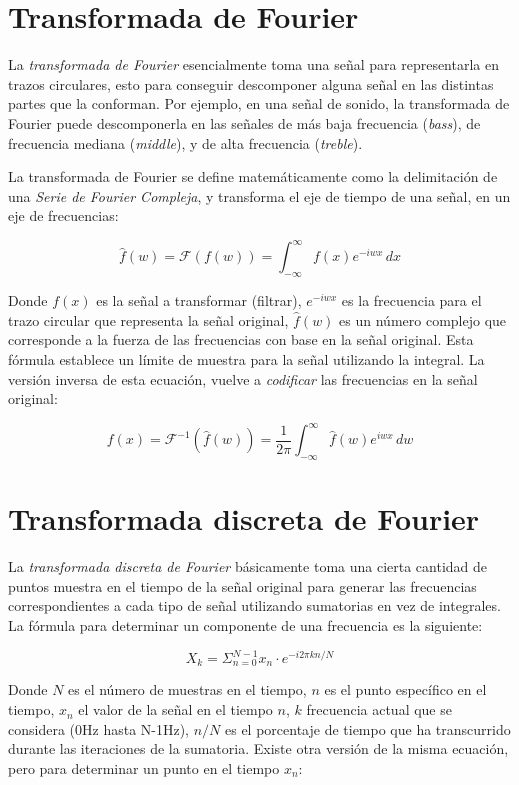 \documentclass[a4paper, 12pt]{article}
\begin{document}
\section*{Transformada de Fourier}
La \emph{transformada de Fourier} esencialmente toma una señal para representarla en trazos circulares, esto para conseguir descomponer alguna señal en las distintas partes que la conforman. Por ejemplo, en una señal de sonido, la transformada de Fourier puede descomponerla en las señales de más baja frecuencia (\emph{bass}), de frecuencia mediana (\emph{middle}), y de alta frecuencia (\emph{treble}).

La transformada de Fourier se define matemáticamente como la delimitación de una \emph{Serie de Fourier Compleja}, y transforma el eje de tiempo de una señal, en un eje de frecuencias:

\begin{equation}
    \hat{f}(w)=\mathcal{F}(f(w))=\int_{-\infty}^{\infty} f(x)e^{-iwx} \,dx
\end{equation}

Donde $f(x)$ es la señal a transformar (filtrar), $e^{-iwx}$ es la frecuencia para el trazo circular que representa la señal original, $\hat{f}(w)$ es un número complejo que corresponde a la fuerza de las frecuencias con base en la señal original. Esta fórmula establece un límite de muestra para la señal utilizando la integral. La versión inversa de esta ecuación, vuelve a \emph{codificar} las frecuencias en la señal original:

\begin{equation}
    f(x)=\mathcal{F}^{-1}(\hat{f}(w))=\frac{1}{2\pi}\int_{-\infty}^{\infty}\hat{f}(w)e^{iwx} \, dw
\end{equation}

\section*{Transformada discreta de Fourier}
La \emph{transformada discreta de Fourier} básicamente toma una cierta cantidad de puntos muestra en el tiempo de la señal original para generar las frecuencias correspondientes a cada tipo de señal utilizando sumatorias en vez de integrales.
La fórmula para determinar un componente de una frecuencia es la siguiente:

\begin{equation}
    X_k=\Sigma_{n=0}^{N-1}x_n\cdot e^{-i2\pi kn/N}
\end{equation}

Donde $N$ es el número de muestras en el tiempo, $n$ es el punto específico en el tiempo, $x_n$ el valor de la señal en el tiempo $n$, $k$ frecuencia actual que se considera (0Hz hasta N-1Hz), $n/N$ es el porcentaje de tiempo que ha transcurrido durante las iteraciones de la sumatoria. Existe otra versión de la misma ecuación, pero para determinar un punto en el tiempo $x_n$:
\end{document}
